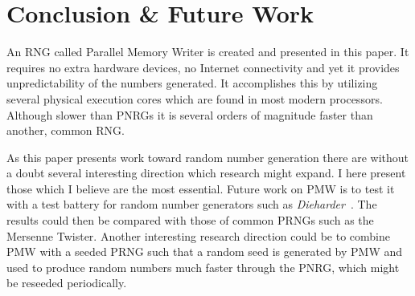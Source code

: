 \section{Conclusion \& Future Work}
\label{sec:conclusion}
An RNG called Parallel Memory Writer is created and presented in this paper.
It requires no extra hardware devices, no Internet connectivity and yet it provides unpredictability of the numbers generated.
It accomplishes this by utilizing several physical execution cores which are found in most modern processors.
Although slower than PNRGs it is several orders of magnitude faster than another, common RNG.

As this paper presents work toward random number generation there are without a doubt several interesting direction which research might expand.
I here present those which I believe are the most essential.
Future work on PMW is to test it with a test battery for random number generators such as \emph{Dieharder}~\citep{dieharder}.
The results could then be compared with those of common PRNGs such as the Mersenne Twister.
Another interesting research direction could be to combine PMW with a seeded PRNG such that a random seed is generated by PMW and used to produce random numbers much faster through the PNRG, which might be reseeded periodically.
